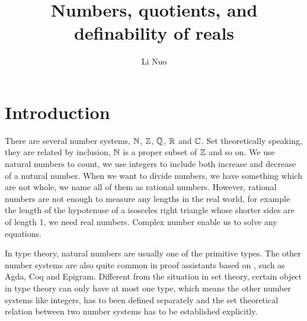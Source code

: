 \documentclass{article}
\begin{document}

\title{Numbers, quotients, and definability of reals}

\author{Li Nuo}


\maketitle


\section{Introduction}



There are several number systems, $\mathbb{N}$, $\mathbb{Z}$, $\mathbb{Q}$, $\mathbb{R}$ and $\mathbb{C}$. Set theoretically speaking, they are related by inclusion, $\mathbb{N}$ is a proper subset of $\mathbb{Z}$ and so on.
We use natural numbers to count, we use integers to include both increase and decrease of a nutural number. When we want to divide
numbers, we have something which are not whole, we name all of them as rational numbers. However, rational numbers are not enough to measure any lengths in the real world, for example 
the length of the hypotenuse of a isosceles right triangle whose shorter sides are of length 1, we need real numbers. Complex number enable us to solve any equations.

In type theory, natural numbers are usually one of the primitive types. The other number systems are also quite common in proof assistants based on \itt{}, such as Agda, Coq and Epigram. Different from the situation in set theory, certain object in type theory can only have at most one type, which means the other number systems like integers, has to been defined separately and the set theoretical relation between two number systems has to be established explicitly. 
\end{document}
